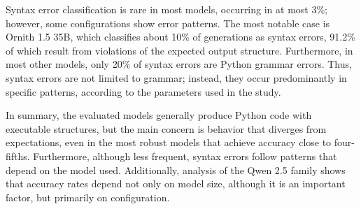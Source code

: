 Syntax error classification is rare in most models, occurring in at most 3\%; however, some configurations show error patterns. The most notable case is Ornith 1.5 35B, which classifies about 10\% of generations as syntax errors, 91.2\% of which result from violations of the expected output structure. Furthermore, in most other models, only 20\% of syntax errors are Python grammar errors. Thus, syntax errors are not limited to grammar; instead, they occur predominantly in specific patterns, according to the parameters used in the study.

In summary, the evaluated models generally produce Python code with executable structures, but the main concern is behavior that diverges from expectations, even in the most robust models that achieve accuracy close to four-fifths. Furthermore, although less frequent, syntax errors follow patterns that depend on the model used. Additionally, analysis of the Qwen 2.5 family shows that accuracy rates depend not only on model size, although it is an important factor, but primarily on configuration.
